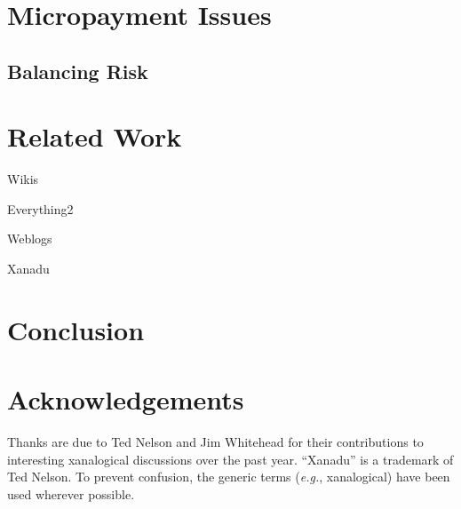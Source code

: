 \documentclass{acm_proc_article-sp}
\begin{document}
\section{Micropayment Issues}


\subsection{Balancing Risk}



\section{Related Work}
\label{sec:RelatedWork}

Wikis
\cite{WikiWikiWeb}
\cite{Wikipedia}

Everything2
\cite{Everything2}

Weblogs
\cite{kuro5hin}

Xanadu

\section{Conclusion}


\section{Acknowledgements}
Thanks are due to Ted Nelson and Jim Whitehead for their contributions to interesting xanalogical discussions over the past year. ``Xanadu'' is a trademark of Ted Nelson.  To prevent confusion, the generic terms ({\it e.g.}, xanalogical) have been used wherever possible.



\end{document}
